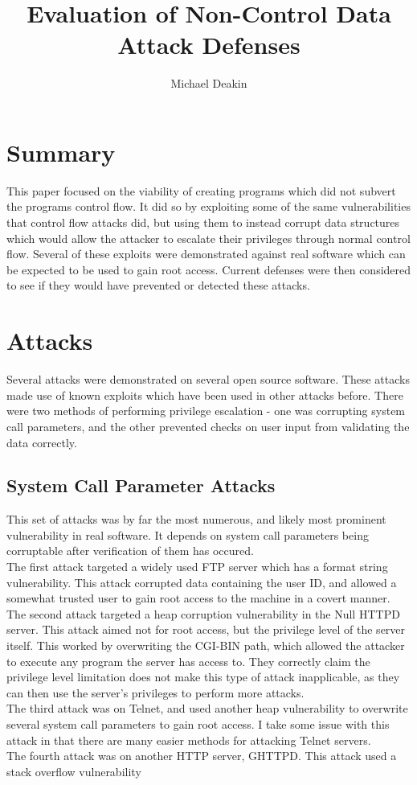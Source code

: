 \documentclass{article}
\title{Evaluation of Non-Control Data Attack Defenses}
\author{Michael Deakin}
\begin{document}
\maketitle
\section{Summary}
This paper focused on the viability of creating programs which did not subvert the programs control flow.
It did so by exploiting some of the same vulnerabilities that control flow attacks did, but using them to instead corrupt data structures which would allow the attacker to escalate their privileges through normal control flow.
Several of these exploits were demonstrated against real software which can be expected to be used to gain root access.
Current defenses were then considered to see if they would have prevented or detected these attacks.
\section{Attacks}
Several attacks were demonstrated on several open source software.
These attacks made use of known exploits which have been used in other attacks before.
There were two methods of performing privilege escalation - one was corrupting system call parameters,
and the other prevented checks on user input from validating the data correctly.
\subsection{System Call Parameter Attacks}
This set of attacks was by far the most numerous,
and likely most prominent vulnerability in real software.
It depends on system call parameters being corruptable after verification of them has occured.\\
The first attack targeted a widely used FTP server which has a format string vulnerability.
This attack corrupted data containing the user ID,
and allowed a somewhat trusted user to gain root access to the machine in a covert manner.\\
The second attack targeted a heap corruption vulnerability in the Null HTTPD server.
This attack aimed not for root access, but the privilege level of the server itself.
This worked by overwriting the CGI-BIN path,
which allowed the attacker to execute any program the server has access to.
They correctly claim the privilege level limitation does not make this type of attack inapplicable,
as they can then use the server's privileges to perform more attacks.\\
The third attack was on Telnet,
and used another heap vulnerability to overwrite several system call parameters to gain root access.
I take some issue with this attack in that there are many easier methods for attacking Telnet servers.\\
The fourth attack was on another HTTP server, GHTTPD.
This attack used a stack overflow vulnerability
\end{document}
